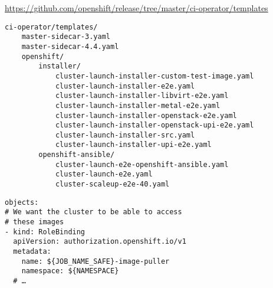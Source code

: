 \begin{frame}[fragile]
    \autotitle
    \url{https://github.com/openshift/release/tree/master/ci-operator/templates}
    \vfill
    \footnotesize
    \begin{verbatim}
ci-operator/templates/
    master-sidecar-3.yaml
    master-sidecar-4.4.yaml
    openshift/
        installer/
            cluster-launch-installer-custom-test-image.yaml
            cluster-launch-installer-e2e.yaml
            cluster-launch-installer-libvirt-e2e.yaml
            cluster-launch-installer-metal-e2e.yaml
            cluster-launch-installer-openstack-e2e.yaml
            cluster-launch-installer-openstack-upi-e2e.yaml
            cluster-launch-installer-src.yaml
            cluster-launch-installer-upi-e2e.yaml
        openshift-ansible/
            cluster-launch-e2e-openshift-ansible.yaml
            cluster-launch-e2e.yaml
            cluster-scaleup-e2e-40.yaml
    \end{verbatim}
    \vfill
\end{frame}


\begin{frame}[fragile]
    \autotitle
    \begin{verbatim}
objects:
# We want the cluster to be able to access
# these images
- kind: RoleBinding
  apiVersion: authorization.openshift.io/v1
  metadata:
    name: ${JOB_NAME_SAFE}-image-puller
    namespace: ${NAMESPACE}
  # …
    \end{verbatim}
\end{frame}

